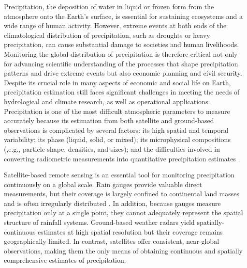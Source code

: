 \documentclass[11pt]{article}
\begin{document}
Precipitation, the deposition of water in liquid or frozen form from the
atmosphere onto the Earth's surface, is essential for sustaining ecosystems and
a wide range of human activity. However, extreme events at both ends of the
climatological distribution of precipitation, such as droughts or heavy
precipitation, can cause substantial damage to societies and human livelihoods.
Monitoring the global distribution of precipitation is therefore critical not
only for advancing scientific understanding of the processes that shape
precipitation patterns and drive extreme events but also economic planning and
civil security. Despite its crucial role in many aspects of economic and social
life on Earth, precipitation estimation still faces significant challenges in
meeting the needs of hydrological and climate research, as well as operational
applications. Precipitation is one of the most difficult atmospheric parameters
to measure accurately because its estimation from both satellite and ground-based
observations is complicated by several factors: its high spatial and temporal
variability; its phase (liquid, solid, or mixed); its microphysical compositions
(,e.g., particle shape, densities, and sizes); and the difficulties involved
in converting radiometric measurements into quantitative precipitation
estimates \citep{Levizzani2020Satellite}.

Satellite-based remote sensing is an essential tool for monitoring precipitation
continuously on a global scale. Rain gauges provide valuable direct
measurements, but their coverage is largely confined to continental land masses
and is often irregularly distributed \citep{Kidd2017RainGauges}. In addition,
because gauges measure precipitation only at a single point, they cannot
adequately represent the spatial structure of rainfall systems. Ground-based
weather radars yield spatially-continuous estimates at high spatial resolution
but their coverage remains geographically limited. In contrast, satellites offer
consistent, near-global observations, making them the only means of obtaining
continuous and spatially comprehensive estimates of precipitation.
\end{document}
